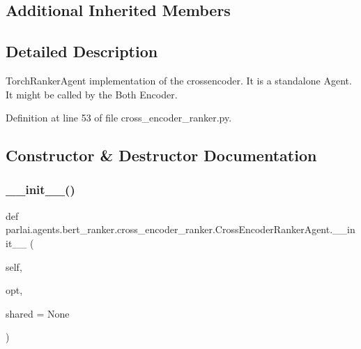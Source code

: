 \subsection*{Additional Inherited Members}


\subsection{Detailed Description}
\begin{DoxyVerb}TorchRankerAgent implementation of the crossencoder.
    It is a standalone Agent. It might be called by the Both Encoder.
\end{DoxyVerb}
 

Definition at line 53 of file cross\+\_\+encoder\+\_\+ranker.\+py.



\subsection{Constructor \& Destructor Documentation}
\mbox{\label{classparlai_1_1agents_1_1bert__ranker_1_1cross__encoder__ranker_1_1CrossEncoderRankerAgent_ab7f5e55dec9f12dc4e4dccc48c682e63}} 
\subsubsection{\texorpdfstring{\+\_\+\+\_\+init\+\_\+\+\_\+()}{\_\_init\_\_()}}
{\footnotesize\ttfamily def parlai.\+agents.\+bert\+\_\+ranker.\+cross\+\_\+encoder\+\_\+ranker.\+Cross\+Encoder\+Ranker\+Agent.\+\_\+\+\_\+init\+\_\+\+\_\+ (\begin{DoxyParamCaption}\item[{}]{self,  }\item[{}]{opt,  }\item[{}]{shared = {\ttfamily None} }\end{DoxyParamCaption})}



